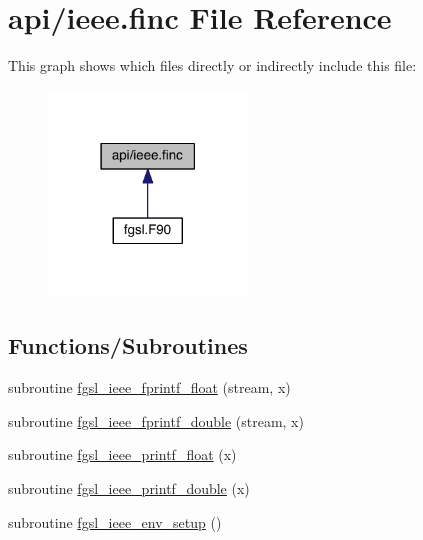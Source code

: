 \hypertarget{ieee_8finc}{\section{api/ieee.finc File Reference}
\label{ieee_8finc}
}
This graph shows which files directly or indirectly include this file\-:\nopagebreak
\begin{figure}[H]
\begin{center}
\leavevmode
\includegraphics[width=150pt]{ieee_8finc__dep__incl}
\end{center}
\end{figure}
\subsection*{Functions/\-Subroutines}
\begin{DoxyCompactItemize}
\item 
subroutine \hyperlink{ieee_8finc_a5656619970e7be3f84c079454cd9977e}{fgsl\-\_\-ieee\-\_\-fprintf\-\_\-float} (stream, x)
\item 
subroutine \hyperlink{ieee_8finc_a3b87a333512c0de9a7093cf0956ca192}{fgsl\-\_\-ieee\-\_\-fprintf\-\_\-double} (stream, x)
\item 
subroutine \hyperlink{ieee_8finc_a61a933397c2e04ae557673fdef8514a7}{fgsl\-\_\-ieee\-\_\-printf\-\_\-float} (x)
\item 
subroutine \hyperlink{ieee_8finc_a3bb5a84b946bdb9d0d3e774759ba0160}{fgsl\-\_\-ieee\-\_\-printf\-\_\-double} (x)
\item 
subroutine \hyperlink{ieee_8finc_af8395e34fef557f25c33ce024526a143}{fgsl\-\_\-ieee\-\_\-env\-\_\-setup} ()
\end{DoxyCompactItemize}


